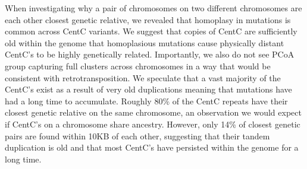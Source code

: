 When investigating why a pair of chromosomes on two different chromosomes are each other closest genetic relative, we revealed that homoplasy in mutations is common across CentC variants.  We suggest that copies of CentC are sufficiently old within the genome that homoplasious mutations cause physically distant CentC’s to be highly genetically related.  Importantly, we also do not see PCoA group capturing full clusters across chromosomes in a way that would be consistent with retrotransposition. We speculate that a vast majority of the CentC’s exist as a result of very old duplications meaning that mutations have had a long time to accumulate. Roughly 80\% of the CentC repeats have their closest genetic relative on the same chromosome, an observation we would expect if CentC’s on a chromosome share ancestry.  However, only 14\% of closest genetic pairs are found within 10KB of each other, suggesting that their tandem duplication is old and that most CentC’s have persisted within the genome for a long time. 

